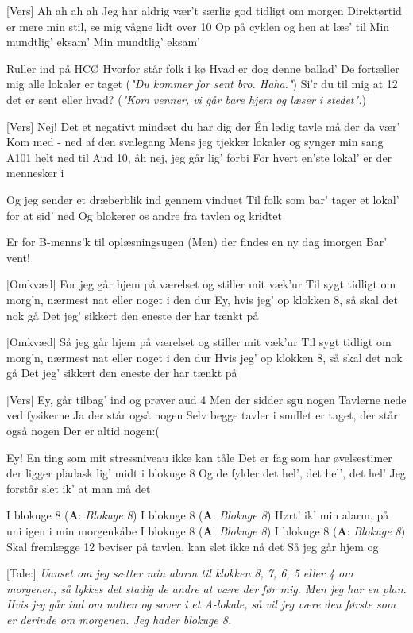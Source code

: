 \documentclass[a4paper,11pt]{article}
\begin{document}
\begin{song}
[Vers] 
Ah ah ah ah 
Jeg har aldrig vær't særlig god tidligt om morgen 
Direktørtid er mere min stil, se mig vågne lidt over 10 
Op på cyklen og hen at læs' til 
Min mundtlig' eksam' 
Min mundtlig' eksam'

Ruller ind på HCØ 
Hvorfor står folk i kø 
Hvad er dog denne ballad'
De fortæller mig alle lokaler er taget 
(\textit{"Du kommer for sent bro. Haha."})
Si'r du til mig at 12 det er sent eller hvad? 
(\textit{"Kom venner, vi går bare hjem og læser i stedet".})

[Vers]
Nej! 
Det et negativt mindset du har dig der  
Én ledig tavle må der da vær'
Kom med - ned af den svalegang
Mens jeg tjekker lokaler og synger min sang
A101 helt ned til Aud 10, åh nej, jeg går lig' forbi 
For hvert en'ste lokal' er der mennesker i

Og jeg sender et dræberblik ind gennem vinduet 
Til folk som bar' tager et lokal' for at sid' ned 
Og blokerer os andre fra tavlen og kridtet 

Er for B-menns'k til oplæsningsugen
(Men) der findes en ny dag imorgen 
Bar' vent!

[Omkvæd] 
For jeg går hjem på værelset og stiller mit væk'ur 
Til sygt tidligt om morg'n, nærmest nat eller noget i den dur 
Ey, hvis jeg' op klokken 8, så skal det nok gå
Det jeg' sikkert den eneste der har tænkt på 

[Omkvæd] 
Så jeg går hjem på værelset og stiller mit væk'ur 
Til sygt tidligt om morg'n, nærmest nat eller noget i den dur 
Hvis jeg' op klokken 8, så skal det nok gå
Det jeg' sikkert den eneste der har tænkt på 

[Vers] 
Ey, går tilbag' ind og prøver aud 4 
Men der sidder sgu nogen
Tavlerne nede ved fysikerne
Ja der står også nogen
Selv begge tavler i snullet er taget, der står også nogen
Der er altid nogen:(

Ey! En ting som mit stressniveau ikke kan tåle
Det er fag som har øvelsestimer der ligger pladask lig' midt i blokuge 8
Og de fylder det hel', det hel', det hel'
Jeg forstår slet ik' at man må det

I blokuge 8 (\textbf{A}: \textit{Blokuge 8})
I blokuge 8 (\textbf{A}: \textit{Blokuge 8})
Hørt' ik' min alarm, på uni igen i min morgenkåbe 
I blokuge 8 (\textbf{A}: \textit{Blokuge 8})
I blokuge 8 (\textbf{A}: \textit{Blokuge 8})
Skal fremlægge 12 beviser på tavlen, kan slet ikke nå det
Så jeg går hjem og


[Tale:] 
\textit{Uanset om jeg sætter min alarm til klokken 8, 7, 6, 5 eller 4 om morgenen, så lykkes det stadig de andre at være der før mig. 
Men jeg har en plan. Hvis jeg går ind om natten og sover i et A-lokale, så vil jeg være den første som er derinde om morgenen. 
Jeg hader blokuge 8. 
}


\end{song}
\end{document}
